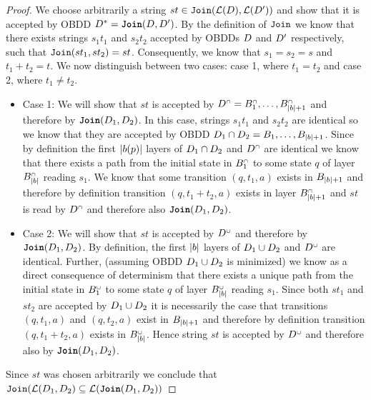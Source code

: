 \begin{proof}
    We choose arbitrarily a  string $st \in \texttt{Join}(\mathcal{L}(D),\mathcal{L}(D'))$ and show that it is accepted by OBDD $D^* = \texttt{\textbf{Join}}(D,D')$.
    By the definition of $\texttt{Join}$ we know that there exists strings $s_1t_1$ and $s_2t_2$ accepted by OBDDs $D$ and $D'$ respectively, such that $\texttt{Join}(st_1,st_2) = st$. Consequently, we know that $s_1 = s_2 = s$ and $t_1 +t_2 = t$. We now distinguish between two cases: case 1, where $t_1 = t_2$ and case 2, where $t_1 \neq t_2$.
    \begin{itemize}
        \item Case 1: We will show that $st$ is accepted by $D^{\scriptscriptstyle\cap} = B_1^{{\scriptscriptstyle\cap}},\ldots,B_{|b|+1}^{{\scriptscriptstyle\cap}}$ and therefore by $\texttt{\textbf{Join}}(D_1,D_2)$. In this case, strings $s_1t_1$ and $s_2t_2$ are identical so we know that they are accepted by OBDD $D_1 \cap D_2 = B_1,\ldots,B_{|b|+1}$. Since by definition the first $|b(p)|$ layers of $D_1 \cap D_2$ and $D^{\scriptscriptstyle\cap}$ are identical we know that there exists a path from the initial state in $B^{\scriptscriptstyle\cap}_1$ to some state $q$ of layer $B_{|b|}^{\scriptscriptstyle\cap}$ reading $s_1$. We know that some transition $(q,t_1,a)$ exists in $B_{|b|+1}$ and therefore by definition transition $(q,t_1+t_2,a)$ exists in layer $B_{|b|+1}^{\scriptscriptstyle\cap}$ and $st$ is read by $D^{\scriptscriptstyle\cap}$ and therefore also $\texttt{\textbf{Join}}(D_1,D_2)$.
        
        \item Case 2: We will show that $st$ is accepted by $D^{\scriptscriptstyle\cup}$ and therefore by $\texttt{\textbf{Join}}(D_1,D_2)$. By definition, the first $|b|$ layers of $D_1 \cup D_2$ and $D^{\scriptscriptstyle\cup}$ are identical. Further, (assuming OBDD $D_1 \cup D_2$ is minimized) we know as a direct consequence of determinism that there exists a unique path from the initial state in $B^{\scriptscriptstyle\cup}_1$ to some state $q$ of layer $B_{|b|}^{\scriptscriptstyle\cup}$ reading $s_1$. Since both $st_1$ and $st_2$ are accepted by $D_1 \cup D_2$ it is necessarily the case that transitions $(q, t_1, a)$ and $(q,t_2,a)$ exist in $B_{|b|+1}$ and therefore by definition transition $(q,t_1 + t_2,a)$ exists in $B_{|b|}^{\scriptscriptstyle\cup}$. Hence string $st$ is accepted by $D^{\scriptscriptstyle\cup}$ and therefore also by $\texttt{\textbf{Join}}(D_1,D_2)$.
    \end{itemize}

    Since $st$ was chosen arbitrarily we conclude that $\texttt{Join}(\mathcal{L}(D_1,D_2)\subseteq\mathcal{L}(\texttt{\textbf{Join}}(D_1,D_2))  $


\end{proof}
